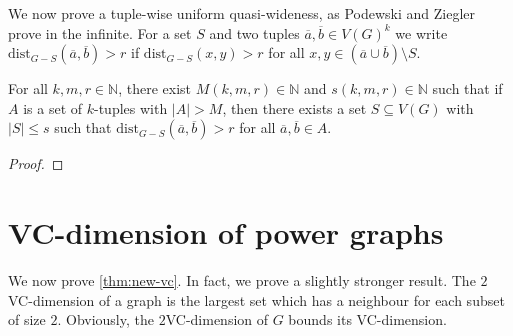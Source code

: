 \documentclass[11pt, fleqn]{article}
\theoremstyle{plain}
\theoremstyle{nonumberplain}
\newtheorem{proof}{Proof.}
\newcommand{\N}{\mathbb{N}}
\newcommand{\tup}[1]{\overline{#1}}
\newcommand{\dist}{\mathrm{dist}}
\begin{document}
We now prove a tuple-wise uniform quasi-wideness, as Podewski and Ziegler 
prove in the infinite. For a set $S$ and two tuples $\tup{a},\tup{b}\in V(G)^k$
we write $\dist_{G-S}(\tup{a},\tup{b})>r$ if $\dist_{G-S}(x,y)>r$ for all $x,y\in 
(\tup{a}\cup\tup{b})\setminus S$. 

\begin{lemma}
For all $k,m,r\in \N$, there exist $M(k,m,r)\in \N$ and 
$s(k,m,r)\in \N$ such that if $A$ is a set of $k$-tuples
with $|A|>M$, then there exists a set $S\subseteq V(G)$
with $|S|\leq s$ such that $\dist_{G-S}(\tup{a},\tup{b})>r$
for all $\tup{a},\tup{b}\in A$. 
\end{lemma}
\begin{proof}

\end{proof}

 

\section{VC-dimension of power graphs}\label{sec:vc}

We now prove \cref{thm:new-vc}. 
In fact, we prove a slightly stronger result. The $2$VC-dimension
of a graph is the largest set which has a neighbour for each 
subset of size $2$. Obviously, the $2$VC-dimension of $G$
bounds its VC-dimension. 
\end{document}

